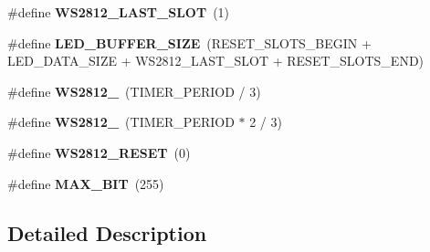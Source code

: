 \begin{DoxyCompactItemize}
\#define {\bfseries W\+S2812\+\_\+\+L\+A\+S\+T\+\_\+\+S\+L\+OT}~(1)
\item 
\mbox{\label{group___w_s2812_ga398165d967d8a2c8ff57ddd0a081a5ff}} 
\#define {\bfseries L\+E\+D\+\_\+\+B\+U\+F\+F\+E\+R\+\_\+\+S\+I\+ZE}~(R\+E\+S\+E\+T\+\_\+\+S\+L\+O\+T\+S\+\_\+\+B\+E\+G\+IN + L\+E\+D\+\_\+\+D\+A\+T\+A\+\_\+\+S\+I\+ZE + W\+S2812\+\_\+\+L\+A\+S\+T\+\_\+\+S\+L\+OT + R\+E\+S\+E\+T\+\_\+\+S\+L\+O\+T\+S\+\_\+\+E\+ND)
\item 
\mbox{\label{group___w_s2812_ga3c67cd1a76ba7e85676da5f023f42430}} 
\#define {\bfseries W\+S2812\+\_}~(T\+I\+M\+E\+R\+\_\+\+P\+E\+R\+I\+OD / 3)
\item 
\mbox{\label{group___w_s2812_gad4cec7bff3f072ffe9ec1e11324c7418}} 
\#define {\bfseries W\+S2812\+\_}~(T\+I\+M\+E\+R\+\_\+\+P\+E\+R\+I\+OD $\ast$ 2 / 3)
\item 
\mbox{\label{group___w_s2812_gaef8a90792d52a7085de6c0affec15557}} 
\#define {\bfseries W\+S2812\+\_\+\+R\+E\+S\+ET}~(0)
\item 
\mbox{\label{group___w_s2812_gaaf645a2813f2274619a70855afb92aca}} 
\#define {\bfseries M\+A\+X\+\_\+B\+IT}~(255)
\end{DoxyCompactItemize}


\subsection{Detailed Description}

